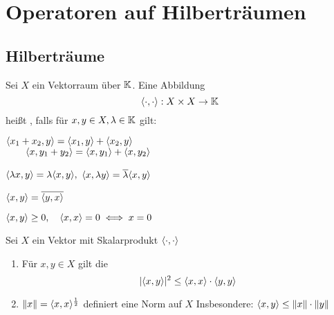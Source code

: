 

\chapter*{Operatoren auf Hilberträumen}  \setcounter{section}{14}



\section{Hilberträume}



\begin{definition} \label{def:15.1-Skalarprodukt}
	Sei $X$ ein Vektorraum über $\mathbb{K}$. Eine Abbildung
	\[ \langle \cdot, \cdot \rangle : X \times X \rightarrow \mathbb{K} \]
	hei{\ss}t , falls für $x, y \in X, \lambda \in \mathbb{K}$ gilt:
	\begin{description}
	 	\label{def:15.1i}
	 	\item[$\hspace{0.5cm} (S1) \hspace{0.1cm} $] $\langle x_{1} + x_{2}, y \rangle = \langle x_{1}, y \rangle + \langle x_{2}, y \rangle$ \\
			 $~\hspace{0.6cm} \langle x, y_{1} + y_{2} \rangle = \langle x, y_{1} \rangle + \langle x, y_{2} \rangle$
 		\label{def:15.1ii}
	 	\item[$\hspace{0.5cm} (S2) \hspace{0.1cm} $] $\langle \lambda x, y \rangle = \lambda \langle x, y \rangle,$ $\langle x, \lambda y \rangle = \overline{\lambda} \langle x, y \rangle$
 		\label{def:15.1iii}
	 	\item[$\hspace{0.5cm} (S3) \hspace{0.1cm} $] $\langle x, y \rangle = \overline{\langle y, x \rangle }$
 		\label{def:15.1iv}
	 	\item[$\hspace{0.5cm} (S4) \hspace{0.1cm} $] $\langle x, y \rangle \geq 0, \quad \langle x, x \rangle = 0 \iff x = 0$
	\end{description}
\end{definition}


\begin{prop} \label{prop:15.2}
	Sei $X$ ein Vektor mit Skalarprodukt $\langle \cdot, \cdot \rangle$
	\begin{enumerate}[label=\alph*\upshape)] \label{prop:15.2a}
		\item Für $x, y \in X$ gilt die 
			\[ | \langle x, y \rangle |^{2} \leq \langle x, x \rangle \cdot \langle y, y \rangle \] \label{prop:15.2b}
		\item $\| x \| = \langle x, x \rangle^{\frac{1}{2}}$ definiert eine Norm auf $X$
			Insbesondere: $\langle x, y \rangle \leq \| x \| \cdot \| y \|$
	\end{enumerate}	
\end{prop}

